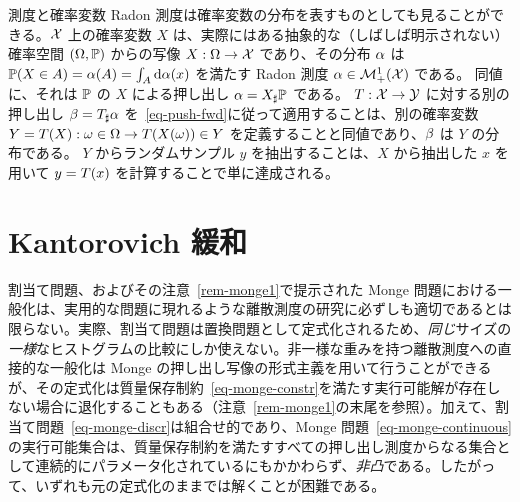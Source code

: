 \begin{rem2}{測度と確率変数}\label{rem-meas-random}
	Radon 測度は確率変数の分布を表すものとしても見ることができる。$\mathcal{X}$ 上の確率変数 $X$ は、実際にはある抽象的な（しばしば明示されない）確率空間 $(\Omega,\mathbb{P})$ からの写像 $X : \Omega \rightarrow \mathcal{X}$ であり、その分布 $\alpha$ は $\mathbb{P}(X \in A) = \alpha(A)=\int_A \mathrm{d}\alpha(x)$ を満たす Radon 測度 $\alpha \in \mathcal{M}_+^1(\mathcal{X})$ である。
	同値に、それは $\mathbb{P}$ の $X$ による押し出し $\alpha=X_\sharp\mathbb{P}$ である。
	$T : \mathcal{X} \rightarrow \mathcal{Y}$ に対する別の押し出し $\beta = T_\sharp\alpha$ を~\eqref{eq-push-fwd}に従って適用することは、別の確率変数 $Y=T(X) : \omega \in \Omega \rightarrow T(X(\omega)) \in Y$ を定義することと同値であり、$\beta$ は $Y$ の分布である。
	$Y$ からランダムサンプル $y$ を抽出することは、$X$ から抽出した $x$ を用いて $y=T(x)$ を計算することで単に達成される。
\end{rem2}


\section{Kantorovich 緩和}\label{sec-kantorovich-relaxation}

割当て問題、およびその注意~\ref{rem-monge1}で提示された Monge 問題における一般化は、実用的な問題に現れるような離散測度の研究に必ずしも適切であるとは限らない。実際、割当て問題は置換問題として定式化されるため、\emph{同じ}サイズの\emph{一様}なヒストグラムの比較にしか使えない。非一様な重みを持つ離散測度への直接的な一般化は Monge の押し出し写像の形式主義を用いて行うことができるが、その定式化は質量保存制約~\eqref{eq-monge-constr}を満たす実行可能解が存在しない場合に退化することもある（注意~\ref{rem-monge1}の末尾を参照）。加えて、割当て問題~\eqref{eq-monge-discr}は組合せ的であり、Monge 問題~\eqref{eq-monge-continuous}の実行可能集合は、質量保存制約を満たすすべての押し出し測度からなる集合として連続的にパラメータ化されているにもかかわらず、\emph{非凸}である。したがって、いずれも元の定式化のままでは解くことが困難である。

